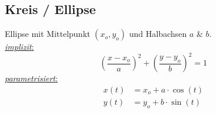 \subsection{Kreis / Ellipse}
    Ellipse mit Mittelpunkt $(x_o, y_o)$ und Halbachsen $a$ \& $b$.\\
    \underline{\textit{implizit}:}
    $$
        \left(
            \frac{x-x_o}{a}
        \right)^2
        +
        \left(
            \frac{y-y_o}{b}
        \right)^2
        = 1
    $$
    \underline{\textit{parametrisiert}:}
    \begin{align*}
        x(t) &= x_o + a \cdot \cos(t)\\
        y(t) &= y_o + b \cdot \sin(t)
    \end{align*}